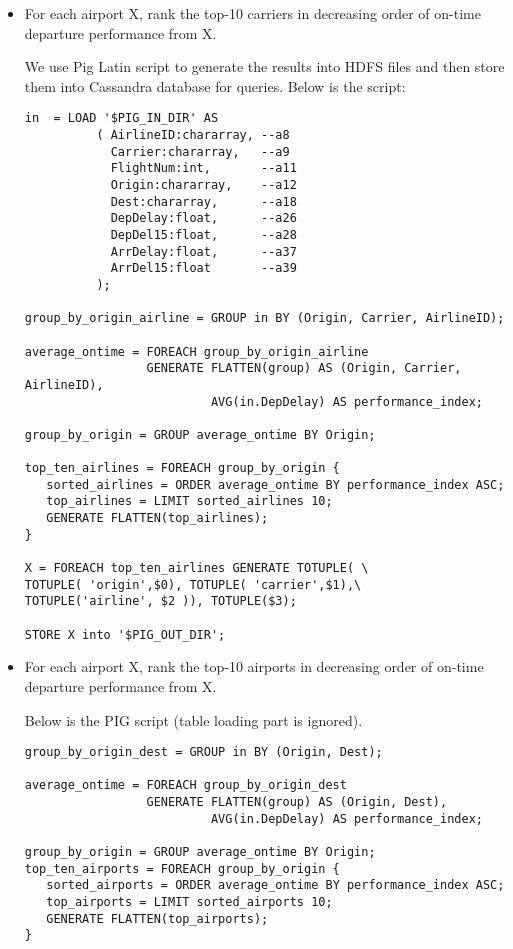 \documentclass[fontsize=11pt,paper=a4,pagesize=auto]{report}
\begin{document}
\begin{itemize} 
\item For each airport X, rank the top-10 carriers in decreasing order of on-time departure performance from X.

We use Pig Latin script to generate the results into HDFS files and then store them into Cassandra database for queries. Below is the script: 

\small\begin{verbatim}
in  = LOAD '$PIG_IN_DIR' AS 
          ( AirlineID:chararray, --a8
            Carrier:chararray,   --a9
            FlightNum:int,       --a11
            Origin:chararray,    --a12       
            Dest:chararray,      --a18
            DepDelay:float,      --a26
            DepDel15:float,      --a28
            ArrDelay:float,      --a37 
            ArrDel15:float       --a39
          );
	
group_by_origin_airline = GROUP in BY (Origin, Carrier, AirlineID);

average_ontime = FOREACH group_by_origin_airline 
                 GENERATE FLATTEN(group) AS (Origin, Carrier, AirlineID), 
                          AVG(in.DepDelay) AS performance_index;

group_by_origin = GROUP average_ontime BY Origin; 
 
top_ten_airlines = FOREACH group_by_origin {
   sorted_airlines = ORDER average_ontime BY performance_index ASC;
   top_airlines = LIMIT sorted_airlines 10;
   GENERATE FLATTEN(top_airlines);
}

X = FOREACH top_ten_airlines GENERATE TOTUPLE( \
TOTUPLE( 'origin',$0), TOTUPLE( 'carrier',$1),\
TOTUPLE('airline', $2 )), TOTUPLE($3);

STORE X into '$PIG_OUT_DIR'; 
\end{verbatim}
\normalsize

\item For each airport X, rank the top-10 airports in decreasing order of on-time departure performance from X.

Below is the PIG script (table loading part is ignored). 
\small\begin{verbatim}
group_by_origin_dest = GROUP in BY (Origin, Dest);

average_ontime = FOREACH group_by_origin_dest 
                 GENERATE FLATTEN(group) AS (Origin, Dest), 
                          AVG(in.DepDelay) AS performance_index;

group_by_origin = GROUP average_ontime BY Origin; 
top_ten_airports = FOREACH group_by_origin {
   sorted_airports = ORDER average_ontime BY performance_index ASC;
   top_airports = LIMIT sorted_airports 10;
   GENERATE FLATTEN(top_airports);
}


\end{verbatim}
\end{itemize}
\end{document}
